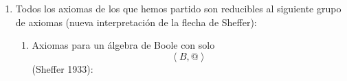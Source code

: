 \documentclass[
]{article}
\providecommand{\tightlist}{%
  \setlength{\itemsep}{0pt}\setlength{\parskip}{0pt}}
\begin{document}
\begin{enumerate}
\begin{enumerate}
\begin{enumerate}
\begin{enumerate}
\begin{enumerate}
          \begin{enumerate}
          \def\labelenumvi{\arabic{enumvi}.}
          \item
            \[\forall x\exists y{{x + y} = 1}\]

            \begin{enumerate}
            \def\labelenumvii{\arabic{enumvii}.}
            \tightlist
            \item
              \[y{: = x}@{x = x}'\]
            \item
              \[{x + x}{' = {({x@x'})}}{' = 0}{' = 1}\]
            \end{enumerate}
          \item
            \[\forall x\exists y{{x \cdot y} = 0}\]

            \begin{enumerate}
            \def\labelenumvii{\arabic{enumvii}.}
            \tightlist
            \item
              \[y{: = x}@{x = x}'\]
            \item
              \[{x \cdot x}{{{' = {x'@x}} = {x@x'}} = 0}\]
            \end{enumerate}
          \end{enumerate}
        \item
          Definición: \[\overline{x} ≝ {x@x}{\equiv}x'\]
        \end{enumerate}
      \end{enumerate}
    \item
      Todos los axiomas de los que hemos partido son reducibles al
      siguiente grupo de axiomas (nueva interpretación de la flecha de
      Sheffer):

      \begin{enumerate}
      \def\labelenumiv{\arabic{enumiv}.}
      \item
        Axiomas para un álgebra de Boole con
        solo\[\left\langle {B,@} \right\rangle\](Sheffer 1933):


\end{enumerate}
\end{enumerate}
\end{enumerate}
\end{enumerate}
\end{document}
